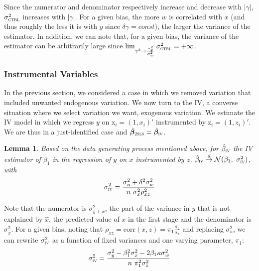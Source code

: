 \documentclass[usletter, 12pt]{article}
\newtheorem{lemma}{Lemma}
\begin{document}
				Since the numerator and denominator respectively increase and decrease with $|\gamma|$,  $\sigma_{\textsc{ctrl}}^{2}$ increases with $|\gamma|$. For a given bias, the more $w$ is correlated with $x$ (and thus roughly the less it is with $y$ since $\delta \gamma = const$), the larger the variance of the estimator. In addition, we can note that, for a given bias, the variance of the estimator can be arbitrarily large since $\lim_{\gamma^{2} \to \frac{\sigma_{x}^{2}}{\sigma_{w}^{2}}} \sigma_{\textsc{ctrl}}^{2} = + \infty$.
				
			
		
		\subsubsection{Instrumental Variables}
		
			In the previous section, we considered a case in which we removed variation that included unwanted endogenous variation. We now turn to the IV, a converse situation where we select variation we want, exogenous variation. We estimate the IV model in which we regress $y$ on $\text{x}_{i} = (1, x_{i})'$ instrumented by $\text{z}_{i} = (1, z_{i})'$. We are thus in a just-identified case and $\hat{\bm{\beta}}_{\textsc{2sls}} = \hat{\bm{\beta}}_{\textsc{iv}}$.						
			\begin{lemma}\label{lemma_iv}
				Based on the data generating process mentioned above, for $\hat{\beta}_{\textsc{iv}}$ the IV estimator of $\beta_{1}$ in the regression of $y$ on $x$ instrumented by $z$,  $\hat{\beta}_{\textsc{iv}} \overset{d}{\to} \mathcal{N}(\beta_{1}, \ \sigma_{\textsc{iv}}^{2})$, with
					\[
						\sigma_{\textsc{iv}}^{2} = \dfrac{\sigma_{u}^{2} + \delta^{2}\sigma_{w}^{2}}{n \ \sigma_{x}^{2} \rho_{xz}^{2}}
					\]
			\end{lemma}
			
			Note that the numerator is $\sigma_{y \perp \hat{x}}^{2}$, the part of the variance in $y$ that is not explained by $\hat{x}$, the predicted value of $x$ in the first stage and the denominator is $\sigma_{\hat{x}}^{2}$. For a given bias, noting that $\rho_{xz} = \text{corr}(x, z) = \pi_1 \frac{\sigma_z}{\sigma_x}$ and replacing $\sigma_{u}^{2}$, we can rewrite $\sigma_{\textsc{iv}}^{2}$ as a function of fixed variances and one varying parameter, $\pi_{1}$:
			\[
				\sigma_{\textsc{iv}}^{2} = \dfrac{\sigma_{y}^{2} - \beta_{1}^{2}\sigma_{x}^{2} - 2\beta_{1}\kappa \sigma_{w}^{2}}{n \ \pi_{1}^{2} \sigma_{z}^{2}}
			\]
			
\end{document}
